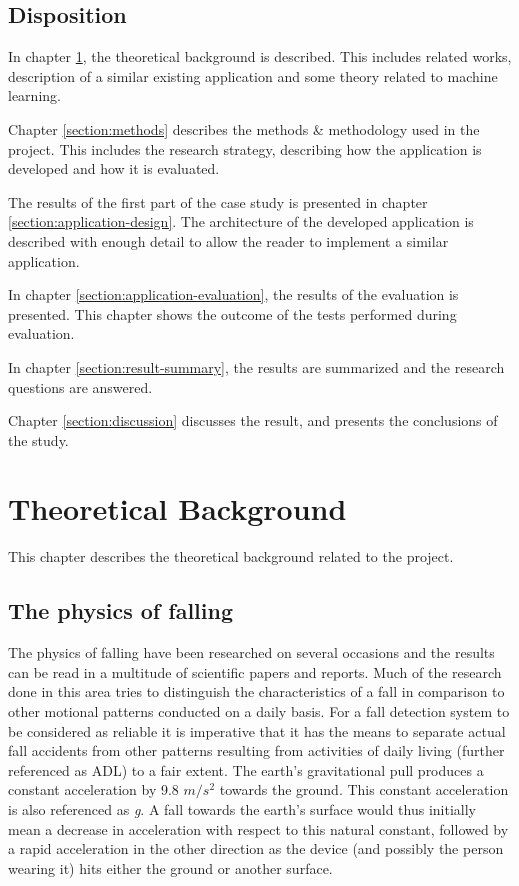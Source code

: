 \documentclass[12pt, a4paper, onecolumn]{article}
\begin{document}
	\subsection{Disposition}
	
	In chapter \ref{section:theoretical-background}, the theoretical background is described. This includes related works, description of a similar existing application and some theory related to machine learning.
	
	Chapter \ref{section:methods} describes the methods \& methodology used in the project. This includes the research strategy, describing how the application is developed and how it is evaluated.
	
	The results of the first part of the case study is presented in chapter \ref{section:application-design}. The architecture of the developed application is described with enough detail to allow the reader to implement a similar application.
	
	In chapter \ref{section:application-evaluation}, the results of the evaluation is presented. This chapter shows the outcome of the tests performed during evaluation.
	
	In chapter \ref{section:result-summary}, the results are summarized and the research questions are answered.
	
	Chapter \ref{section:discussion} discusses the result, and presents the conclusions of the study.
	\newpage
	
	\section{Theoretical Background} \label{section:theoretical-background}
	
	This chapter describes the theoretical background related to the project.
	
	\subsection{The physics of falling}
	The physics of falling have been researched on several occasions and the results can be read in a multitude of scientific papers and reports. Much of the research done in this area tries to distinguish the characteristics of a fall in comparison to other motional patterns conducted on a daily basis. For a fall detection system to be considered as reliable it is imperative that it has the means to separate actual fall accidents from other patterns resulting from activities of daily living (further referenced as ADL) to a fair extent. The earth's gravitational pull produces a constant acceleration by 9.8 $m/s^{2}$ towards the ground. This constant acceleration is also referenced as \textit{g}. A fall towards the earth's surface would thus initially mean a decrease in acceleration with respect to this natural constant, followed by a rapid acceleration in the other direction as the device (and possibly the person wearing it) hits either the ground or another surface.
	
\end{document}
